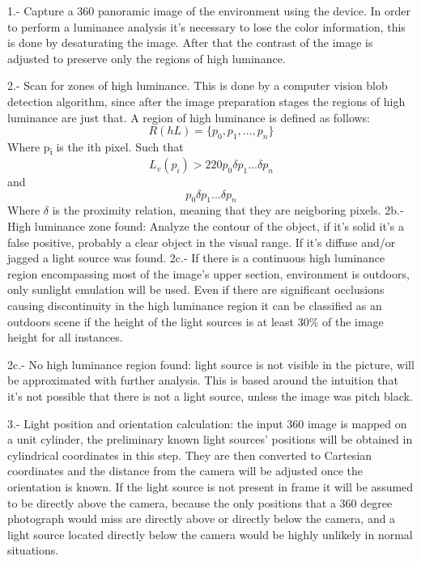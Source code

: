 \documentclass{article}
\begin{document}
1.- Capture a 360 panoramic image of the environment using the device. In order to perform a luminance analysis it's necessary to lose the color information, this is done by desaturating the image. After that the contrast of the image is adjusted to preserve only the regions of high luminance.

2.- Scan for zones of high luminance. This is done by a computer vision blob detection algorithm, since after the image preparation stages the regions of high luminance are just that. A region of high luminance is defined as follows:
\[
    R(hL) = \{p_0, p_1, ... , p_n\}
\]
 Where p\textsubscript{i} is the ith pixel. Such that 
\[
    L_v(p_i) > 220  p_0 \delta p_1 ... \delta p_n  
\]
and
\[
    p_0 \delta p_1 ... \delta p_n  
\]
Where $\delta$ is the proximity relation, meaning that they are neigboring pixels.\newline
2b.- High luminance zone found: Analyze the contour of the object, if it's solid it's a false positive, probably a clear object in the visual range. If it's diffuse and/or jagged a light source was found. 
2c.- If there is a continuous high luminance region encompassing most of the image's upper section, environment is outdoors, only sunlight emulation will be used. Even if there are significant occlusions causing discontinuity in the high luminance region it can be classified as an outdoors scene if the height of the light sources is at least 30\% of the image height for all instances.

2c.- No high luminance region found: light source is not visible in the picture, will be approximated with further analysis. This is based around the intuition that it's not possible that there is not a light source, unless the image was pitch black.

3.- Light position and orientation calculation: the input 360 image is mapped on a unit cylinder, the preliminary known light sources' positions will be obtained in cylindrical coordinates in this step. They are then converted to Cartesian coordinates and the distance from the camera will be adjusted once the orientation is known. If the light source is not present in frame it will be assumed to be directly above the camera, because the only positions that a 360 degree photograph would miss are directly above or directly below the camera, and a light source located directly below the camera would be highly unlikely in normal situations.
\end{document}
